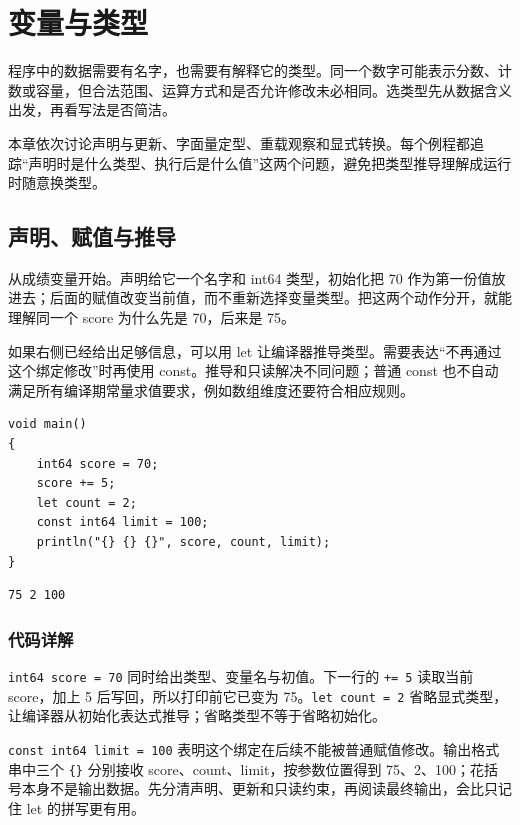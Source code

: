 \chapter{变量与类型}
\label{ch:03}

程序中的数据需要有名字，也需要有解释它的类型。同一个数字可能表示分数、计数或容量，但合法范围、运算方式和是否允许修改未必相同。选类型先从数据含义出发，再看写法是否简洁。

本章依次讨论声明与更新、字面量定型、重载观察和显式转换。每个例程都追踪“声明时是什么类型、执行后是什么值”这两个问题，避免把类型推导理解成运行时随意换类型。

\section{声明、赋值与推导}

从成绩变量开始。声明给它一个名字和 int64 类型，初始化把 70 作为第一份值放进去；后面的赋值改变当前值，而不重新选择变量类型。把这两个动作分开，就能理解同一个 score 为什么先是 70，后来是 75。

如果右侧已经给出足够信息，可以用 let 让编译器推导类型。需要表达“不再通过这个绑定修改”时再使用 const。推导和只读解决不同问题；普通 const 也不自动满足所有编译期常量求值要求，例如数组维度还要符合相应规则。

\par
\medskip
\begin{lstlisting}[style=chali]
void main()
{
    int64 score = 70;
    score += 5;
    let count = 2;
    const int64 limit = 100;
    println("{} {} {}", score, count, limit);
}
\end{lstlisting}
\par
\medskip

\par
\medskip
\begin{lstlisting}[style=out]
75 2 100
\end{lstlisting}
\par
\medskip

\subsection*{代码详解}

\texttt{int64 score =\allowbreak{} 70} 同时给出类型、变量名与初值。下一行的 \texttt{+=\allowbreak{} 5} 读取当前 score，加上 5 后写回，所以打印前它已变为 75。\texttt{let count =\allowbreak{} 2} 省略显式类型，让编译器从初始化表达式推导；省略类型不等于省略初始化。

\texttt{const int64 limit =\allowbreak{} 100} 表明这个绑定在后续不能被普通赋值修改。输出格式串中三个 \texttt{\{\}} 分别接收 score、count、limit，按参数位置得到 75、2、100；花括号本身不是输出数据。先分清声明、更新和只读约束，再阅读最终输出，会比只记住 let 的拼写更有用。

